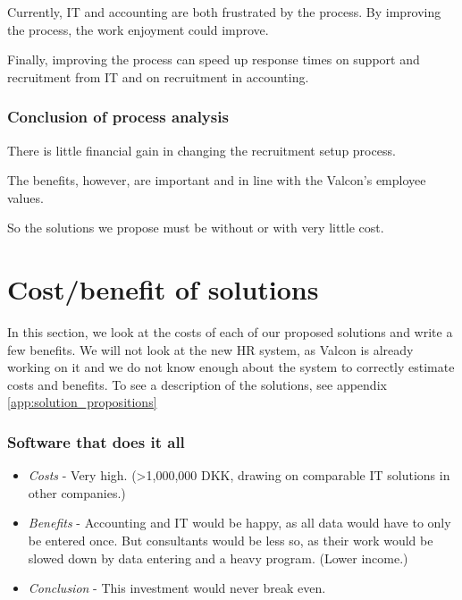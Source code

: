 Currently, IT and accounting are both frustrated by the process.
By improving the process, the work enjoyment could improve.

Finally, improving the process can speed up response times on support and recruitment from IT and on recruitment in accounting.

\subsubsection{Conclusion of process analysis}
There is little financial gain in changing the recruitment setup process.

The benefits, however, are important and in line with the Valcon's employee values.

So the solutions we propose must be without or with very little cost.

\section{Cost/benefit of solutions}
In this section, we look at the costs of each of our proposed solutions and write a few benefits.
We will not look at the new HR system, as Valcon is already working on it and we do not know enough about the system to correctly estimate costs and benefits. 
To see a description of the solutions, see appendix \ref{app:solution_propositions}

\subsubsection{Software that does it all}
\begin{itemize}
\item \emph{Costs} - Very high. (\textgreater 1,000,000 DKK, drawing on comparable IT solutions in other companies.)
\item \emph{Benefits} - Accounting and IT would be happy, as all data would have to only be entered once. But consultants would be less so, as their work would be slowed down by data entering and a heavy program. (Lower income.)
\item \emph{Conclusion} - This investment would never break even.
\end{itemize}

